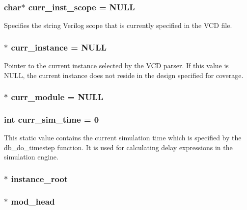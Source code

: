 \subsubsection{\setlength{\rightskip}{0pt plus 5cm}char$\ast$ curr\_\-inst\_\-scope = NULL}\label{db_8c_a6}


Specifies the string Verilog scope that is currently specified in the VCD file. 
\subsubsection{$\ast$ curr\_\-instance = NULL}\label{db_8c_a7}


Pointer to the current instance selected by the VCD parser. If this value is NULL, the current instance does not reside in the design specified for coverage. 
\subsubsection{$\ast$ curr\_\-module = NULL}\label{db_8c_a10}


\subsubsection{\setlength{\rightskip}{0pt plus 5cm}int curr\_\-sim\_\-time = 0}\label{db_8c_a14}


This static value contains the current simulation time which is specified by the db\_\-do\_\-timestep function. It is used for calculating delay expressions in the simulation engine. 
\subsubsection{$\ast$ instance\_\-root}\label{db_8c_a1}


\subsubsection{$\ast$ mod\_\-head}\label{db_8c_a3}


